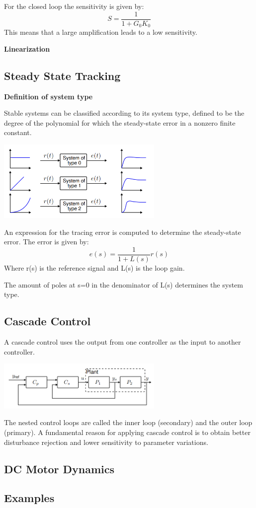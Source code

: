 For the closed loop the sensitivity is given by:
$$S = \frac{1}{1+G_0 K_0}$$
This means that a large amplification leads to a low sensitivity.

\textbf{Linearization}



\subsection{Steady State Tracking}

\textbf{Definition of system type}

Stable systems can be classified according to its system type, defined to be the degree of the polynomial
for which the steady-state error in a nonzero finite constant.


\begin{center}
	\includegraphics[width=0.6\textwidth]{Images/systemTypes.png}
\end{center}


An expression for the tracing error is computed to determine the steady-state error. The error is given by:
$$e(s) = \frac{1}{1+L(s)}r(s)$$
Where r(s) is the reference signal and L(s) is the loop gain.

The amount of poles at s=0 in the denominator of L(s) determines the system type.

\subsection{Cascade Control}
A cascade control uses the output from one controller as the input to another controller.


\begin{center}
	\includegraphics[width=0.6\textwidth]{Images/cascade.png}
\end{center}

The nested control loops are called the inner loop (secondary) and the outer loop (primary).
A fundamental reason for applying cascade control is to obtain better disturbance rejection
and lower sensitivity to parameter variations.


\subsection{DC Motor Dynamics}



\subsection{Examples}
